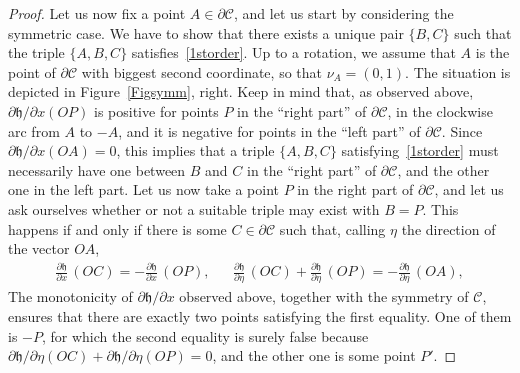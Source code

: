 \documentclass[10pt]{amsart}
\newcommand\C{\mathcal{C}}
\newcommand\h{\mathfrak h}
\theoremstyle{plain}
\theoremstyle{definition}
\begin{document}
\begin{proof}
Let us now fix a point $A\in \partial\C$, and let us start by considering the symmetric case. We have to show that there exists a unique pair $\{B,C\}$ such that the triple $\{A,B,C\}$ satisfies~\eqref{1storder}. Up to a rotation, we assume that $A$ is the point of $\partial\C$ with biggest second coordinate, so that $\nu_A=(0,1)$. The situation is depicted in Figure~\ref{Figsymm}, right. Keep in mind that, as observed above, $\partial\h/\partial x(OP)$ is positive for points $P$ in the ``right part'' of $\partial\C$, \ie in the clockwise arc from $A$ to $-A$, and it is negative for points in the ``left part'' of $\partial \C$. Since $\partial \h/\partial x(OA)=0$, this implies that a triple $\{A,B,C\}$ satisfying~\eqref{1storder} must necessarily have one between $B$ and $C$ in the ``right part'' of $\partial\C$, and the other one in the left part. Let us now take a point $P$ in the right part of $\partial\C$, and let us ask ourselves whether or not a suitable triple may exist with $B=P$. This happens if and only if there is some $C\in\partial\C$ such that, calling $\eta$ the direction of the vector $OA$,
\begin{align}\label{devsod}
\frac{\partial\h}{\partial x}\, (OC) = -\frac{\partial\h}{\partial x}\, (OP), && \frac{\partial\h}{\partial \eta}\, (OC) +\frac{\partial\h}{\partial \eta}\, (OP) = -\frac{\partial\h}{\partial \eta}\, (OA),
\end{align}
The monotonicity of $\partial\h/\partial x$ observed above, together with the symmetry of $\C$, ensures that there are exactly two points satisfying the first equality. One of them is $-P$, for which the second equality is surely false because $\partial \h/\partial\eta(OC) +\partial \h/\partial\eta(OP)=0$, and the other one is some point $P'$.


\end{proof}
\end{document}
